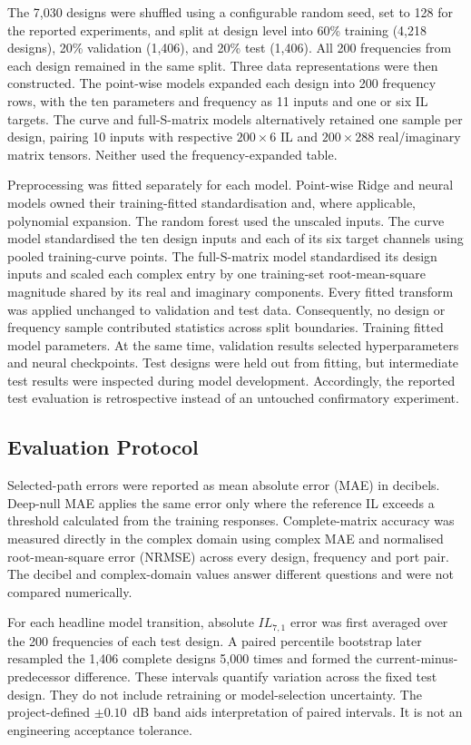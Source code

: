 The 7,030 designs were shuffled using a configurable random seed, set to 128 for the
reported experiments, and split at design level into 60\% training (4,218 designs), 20\%
validation (1,406), and 20\% test (1,406). All 200 frequencies from each design remained
in the same split. Three data representations were then constructed. The point-wise
models expanded each design into 200 frequency rows, with the ten parameters and
frequency as 11 inputs and one or six IL targets. The curve and full-S-matrix models
alternatively retained one sample per design, pairing 10 inputs with respective
$200\times6$ IL and $200\times288$ real/imaginary matrix tensors. Neither used the
frequency-expanded table.

Preprocessing was fitted separately for each model. Point-wise Ridge and neural models
owned their training-fitted standardisation and, where applicable, polynomial expansion.
The random forest used the unscaled inputs. The curve model standardised the ten design
inputs and each of its six target channels using pooled training-curve points. The
full-S-matrix model standardised its design inputs and scaled each complex entry by one
training-set root-mean-square magnitude shared by its real and imaginary components.
Every fitted transform was applied unchanged to validation and test data. Consequently,
no design or frequency sample contributed statistics across split boundaries. Training
fitted model parameters. At the same time, validation results selected hyperparameters
and neural checkpoints. Test designs were held out from fitting, but intermediate test
results were inspected during model development. Accordingly, the reported test
evaluation is retrospective instead of an untouched confirmatory experiment.

\subsection{Evaluation Protocol}
Selected-path errors were reported as mean absolute error (MAE) in decibels. Deep-null
MAE applies the same error only where the reference IL exceeds a threshold calculated
from the training responses. Complete-matrix accuracy was measured directly in the
complex domain using complex MAE and normalised root-mean-square error (NRMSE) across
every design, frequency and port pair. The decibel and complex-domain values answer
different questions and were not compared numerically.

For each headline model transition, absolute $IL_{7,1}$ error was first averaged over
the 200 frequencies of each test design. A paired percentile bootstrap later resampled
the 1,406 complete designs 5,000 times and formed the current-minus- predecessor
difference. These intervals quantify variation across the fixed test design. They do not
include retraining or model-selection uncertainty. The project-defined $\pm0.10$~dB band
aids interpretation of paired intervals. It is not an engineering acceptance tolerance.


